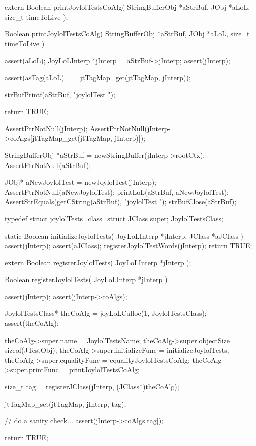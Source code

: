 
\startCHeader
extern Boolean printJoylolTestsCoAlg(
  StringBufferObj *aStrBuf,
  JObj            *aLoL,
  size_t           timeToLive
);
\stopCHeader
{}

\startCCode
Boolean printJoylolTestsCoAlg(
  StringBufferObj *aStrBuf,
  JObj            *aLoL,
  size_t           timeToLive
) {
  assert(aLoL);
  JoyLoLInterp *jInterp = aStrBuf->jInterp;
  assert(jInterp);
  
  assert(asTag(aLoL) == jtTagMap_get(jtTagMap, jInterp));

  strBufPrintf(aStrBuf, "joylolTest ");
  
  return TRUE;
}
\stopCCode


\startCTest
  AssertPtrNotNull(jInterp);
  AssertPtrNotNull(jInterp->coAlgs[jtTagMap_get(jtTagMap, jInterp)]);

  StringBufferObj *aStrBuf = newStringBuffer(jInterp->rootCtx);
  AssertPtrNotNull(aStrBuf);
  
  JObj* aNewJoylolTest = newJoylolTest(jInterp);
  AssertPtrNotNull(aNewJoylolTest);
  printLoL(aStrBuf, aNewJoylolTest);
  AssertStrEquals(getCString(aStrBuf), "joylolTest ");
  strBufClose(aStrBuf);
\stopCTest
\stopTestCase
\stopTestSuite

\startTestSuite[registerJoylolTests]

\startCHeader
typedef struct joylolTests_class_struct {
  JClass         super;
} JoylolTestsClass;

\stopCHeader

\startCCode
static Boolean initializeJoylolTests(
  JoyLoLInterp *jInterp,
  JClass       *aJClass
) {
  assert(jInterp);
  assert(aJClass);
  registerJoylolTestWords(jInterp);
  return TRUE;
}
\stopCCode

\startCHeader
extern Boolean registerJoylolTests(
  JoyLoLInterp *jInterp
);
\stopCHeader
{}

\startCCode
Boolean registerJoylolTests(
  JoyLoLInterp *jInterp
) {
  assert(jInterp);
  assert(jInterp->coAlgs);
  
  JoylolTestsClass* theCoAlg
    = joyLoLCalloc(1, JoylolTestsClass);
  assert(theCoAlg);
  
  theCoAlg->super.name           = JoylolTestsName;
  theCoAlg->super.objectSize     = sizeof(JTestObj);
  theCoAlg->super.initializeFunc = initializeJoylolTests;
  theCoAlg->super.equalityFunc   = equalityJoylolTestsCoAlg;
  theCoAlg->super.printFunc      = printJoylolTestsCoAlg;
  
  size_t tag =
    registerJClass(jInterp, (JClass*)theCoAlg);
  
  jtTagMap_set(jtTagMap, jInterp, tag);
  
  // do a sanity check...
  assert(jInterp->coAlgs[tag]);
   
  return TRUE;
}
\stopCCode

